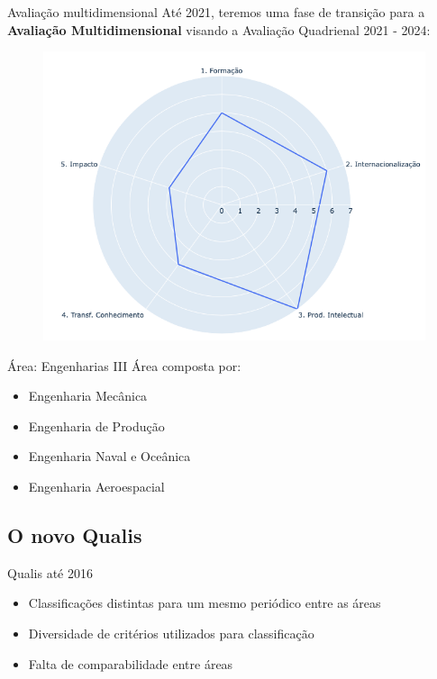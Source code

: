 \begin{frame}{Avaliação multidimensional}
Até 2021, teremos uma fase de transição para a \textbf{Avaliação Multidimensional} visando a
Avaliação Quadrienal 2021 - 2024:
\begin{figure}
\centering
\includegraphics[scale=0.3]{figs/03/multidimensional}
\end{figure}
\end{frame}

\begin{frame}{Área: Engenharias III}
Área composta por:

\begin{itemize}
\item Engenharia Mecânica
\item Engenharia de Produção
\item Engenharia Naval e Oceânica
\item Engenharia Aeroespacial
\end{itemize}
\end{frame}

\subsection{O novo Qualis}

\begin{frame}{Qualis até 2016}
\begin{itemize}
\item Classificações distintas para um mesmo periódico entre as áreas
\item Diversidade de critérios utilizados para classificação
\item Falta de comparabilidade entre áreas
\end{itemize}
\end{frame}

